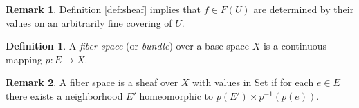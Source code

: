\documentclass{article}
\theoremstyle{definition}
\newtheorem{definition}{Definition}
\newtheorem*{remark}{Remark}
\begin{document}
\begin{remark}
    Definition \ref{def:sheaf} implies that $f \in F(U)$ are determined by their values on an arbitrarily fine covering of $U$.
\end{remark}

\begin{definition}
    A \emph{fiber space} (or \emph{bundle}) over a base space $X$ is a continuous mapping $p: E \rightarrow X$.
\end{definition}

\begin{remark}
    A fiber space is a sheaf over $X$ with values in Set if for each $e \in E$ there exists a neighborhood $E'$ homeomorphic to $p(E') \times p^{-1}(p(e))$.
\end{remark}



\end{document}
